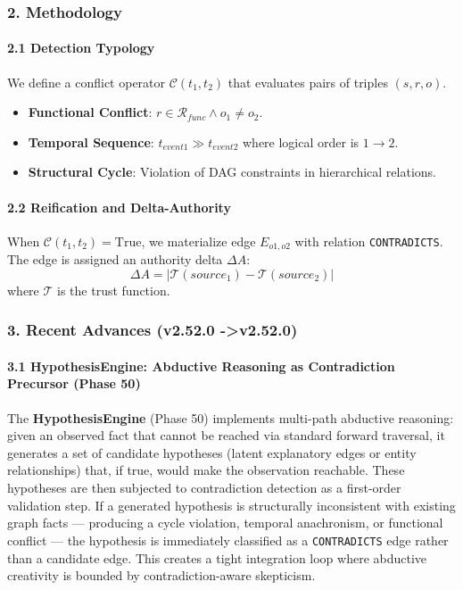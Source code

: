 \subsubsection{2. Methodology}

\paragraph{2.1 Detection Typology}
We define a conflict operator $\mathcal{C}(t_1, t_2)$ that evaluates pairs of triples $(s, r, o)$.
\begin{itemize}
\item \textbf{Functional Conflict}: $r \in \mathcal{R}_{func} \land o_1 \neq o_2$.
\item \textbf{Temporal Sequence}: $t_{event1} \gg t_{event2}$ where logical order is $1 \to 2$.
\item \textbf{Structural Cycle}: Violation of DAG constraints in hiera\-rchical relations.

\end{itemize}
\paragraph{2.2 Reification and Delta-Authority}
When $\mathcal{C}(t_1, t_2) = \text{True}$, we materialize edge $E_{o1,o2}$ with relation \texttt{CONTRADICTS}. The edge is assigned an authority delta $\Delta A$:
\begin{equation}
\Delta A = | \mathcal{T}(source_1) - \mathcal{T}(source_2) |
\end{equation}
where $\mathcal{T}$ is the trust function.

\subsubsection{3. Recent Advances (v2.52.0 -\textgreater  v2.52.0)}

\paragraph{3.1 HypothesisEngine: Abductive Reasoning as Contra\-diction Precursor (Phase 50)}
The \textbf{HypothesisEngine} (Phase 50) implements multi-path abductive reasoning: given an observed fact that cannot be reached via standard forward traversal, it generates a set of candidate hypotheses (latent explanatory edges or entity relat\-ionships) that, if true, would make the observation reachable. These hypotheses are then subjected to contr\-adiction detection as a first-order validation step. If a generated hypothesis is struc\-turally incon\-sistent with existing graph facts — producing a cycle violation, temporal anachronism, or functional conflict — the hypothesis is immediately classified as a \texttt{CONTRADICTS} edge rather than a candidate edge. This creates a tight integration loop where abductive creativity is bounded by contr\-adiction-aware skepticism.

